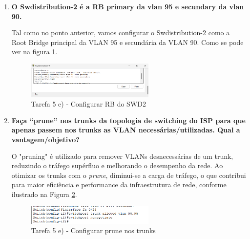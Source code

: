 \documentclass[11pt,english, openright, oneside]{book}
\begin{document}
\begin{enumerate}[label=\Roman*.]
    \vspace{0.8cm}
    
    \item \textbf{O Swdistribution-2 é a RB primary da vlan 95 e secundary da
    vlan 90.}
    \vspace{0.2cm}

    Tal como no ponto anterior, vamos configurar o Swdistribution-2 como a Root
    Bridge principal da VLAN 95 e secundária da VLAN 90. Como se pode ver na
    figura \ref{fig:5.e.3}.

    \begin{figure}[H]
        \centering
        \includegraphics[width=0.6\textwidth]{imagens/Tarefa5/5.e.3.png}
        \caption{Tarefa 5 e) - Configurar RB do SWD2}
        \label{fig:5.e.3}
    \end{figure}

    \vspace{0.8cm}
    
    \item \textbf{Faça “prune” nos trunks da topologia de switching do ISP para
    que apenas passem nos trunks as VLAN necessárias/utilizadas. Qual a
    vantagem/objetivo?}
    \vspace{0.2cm}

    O "pruning" é utilizado para remover VLANs desnecessárias de um trunk,
    reduzindo o tráfego supérfluo e melhorando o desempenho da rede. Ao otimizar
    os trunks com o \textit{prune}, diminui-se a carga de tráfego, o que
    contribui para maior eficiência e performance da infraestrutura de rede,
    conforme ilustrado na Figura \ref{fig:5.e.4}.

    \begin{figure}[H]
        \centering
        \includegraphics[width=0.6\textwidth]{imagens/Tarefa5/5.e.4.png}
        \caption{Tarefa 5 e) - Configurar prune nos trunks}
        \label{fig:5.e.4}
    \end{figure}

    \vspace{0.8cm}
    

\end{enumerate}
\end{document}
